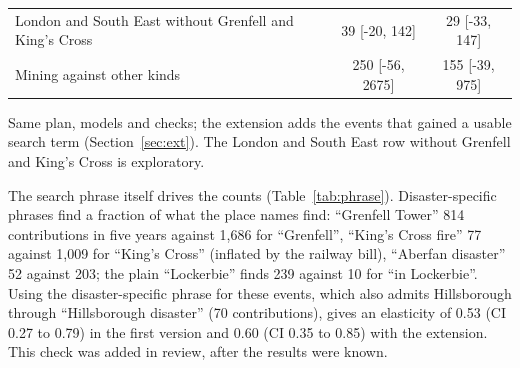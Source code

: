 \documentclass[11pt,a4paper]{article}
\begin{document}
\begin{table}[tbp]
\begin{threeparttable}
\begin{tabular}{lcc}
\quad London and South East without Grenfell and King's Cross & 39 [-20, 142] & 29 [-33, 147]\\
\quad Mining against other kinds & 250 [-56, 2675] & 155 [-39, 975]\\
\bottomrule\end{tabular}\begin{tablenotes}\footnotesize\item Same plan, models and checks; the extension adds the events that gained a usable search term (Section~\ref{sec:ext}). The London and South East row without Grenfell and King's Cross is exploratory.\end{tablenotes}\end{threeparttable}\end{table}

The search phrase itself drives the counts (Table~\ref{tab:phrase}). Disaster-specific phrases find a fraction of what the place names find: ``Grenfell Tower'' 814 contributions in five years against 1,686 for ``Grenfell'', ``King's Cross fire'' 77 against 1,009 for ``King's Cross'' (inflated by the railway bill), ``Aberfan disaster'' 52 against 203; the plain ``Lockerbie'' finds 239 against 10 for ``in Lockerbie''. Using the disaster-specific phrase for these events, which also admits Hillsborough through ``Hillsborough disaster'' (70 contributions), gives an elasticity of 0.53 (CI 0.27 to 0.79) in the first version and 0.60 (CI 0.35 to 0.85) with the extension. This check was added in review, after the results were known.
\end{document}
